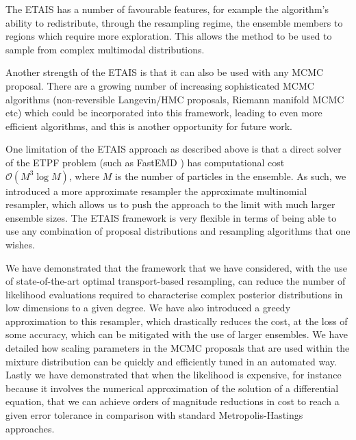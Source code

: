 \documentclass[final]{siamltex}
\newcommand{\revised}{}
\begin{document}

The ETAIS has a number of favourable features, for example the
algorithm's ability to redistribute, through the resampling regime,
the ensemble members to regions which require more exploration. This allows the
method to be used to sample from complex multimodal distributions.

Another strength of the ETAIS is that it can also be used with any MCMC
proposal. There are a growing number of increasing sophisticated MCMC
algorithms (non-reversible Langevin/HMC proposals, Riemann manifold MCMC etc) which could be
incorporated into this framework, leading to even more efficient
algorithms, and this is another opportunity for future work. 

One limitation of the ETAIS approach as described above is that a
direct solver of the ETPF problem (such as FastEMD \cite{FastEMD}) has computational cost
$\mathcal{O}(M^3\log M)$, where $M$ is the number of particles in the
ensemble. As such, we introduced a more approximate resampler the
approximate multinomial resampler, which allows us to push the
approach to the limit
with much larger ensemble sizes. The ETAIS framework is very flexible
in terms of being able to use any combination of proposal
distributions and resampling algorithms that one wishes.

We have demonstrated that the framework that we have considered, with
the use of state-of-the-art optimal transport-based resampling, can
reduce the number of likelihood evaluations required to characterise
complex posterior distributions in low dimensions to a given
degree. We have also introduced a greedy approximation to this
resampler, which drastically reduces the cost, at the loss of some
accuracy, which can be mitigated with the use of larger
ensembles. We have detailed how scaling parameters in the MCMC
proposals that are used within the mixture distribution can be quickly
and efficiently
tuned in an automated way. Lastly we have demonstrated that when the
likelihood is expensive, for instance because it involves the
numerical approximation of the solution of a differential equation, {\revised
that we can achieve orders of magnitude reductions in cost to reach a
given error tolerance in comparison with standard Metropolis-Hastings approaches.}
\end{document}
